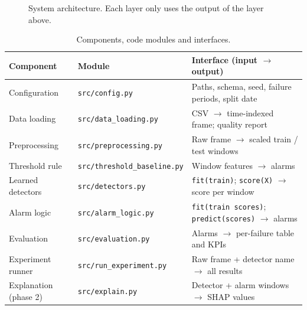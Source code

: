 \begin{figure}[H]
\centering
{}
\caption{System architecture. Each layer only uses the output of the layer above.}
\label{fig:architecture}
\end{figure}

\begin{table}[H]
\centering
\small
\caption{Components, code modules and interfaces.}
\label{tab:modules}
\begin{tabular}{p{2.6cm}p{5.0cm}p{7.3cm}}
\toprule
Component & Module & Interface (input $\rightarrow$ output) \\
\midrule
Configuration & \texttt{src/config.py} & Paths, schema, seed, failure periods, split date \\
Data loading & \texttt{src/data\_loading.py} & CSV $\rightarrow$ time-indexed frame; quality report \\
Preprocessing & \texttt{src/preprocessing.py} & Raw frame $\rightarrow$ scaled train / test windows \\
Threshold rule & \texttt{src/threshold\_baseline.py} & Window features $\rightarrow$ alarms \\
Learned detectors & \texttt{src/detectors.py} & \texttt{fit(train)}; \texttt{score(X)} $\rightarrow$ score per window \\
Alarm logic & \texttt{src/alarm\_logic.py} & \texttt{fit(train scores)}; \texttt{predict(scores)} $\rightarrow$ alarms \\
Evaluation & \texttt{src/evaluation.py} & Alarms $\rightarrow$ per-failure table and KPIs \\
Experiment runner & \texttt{src/run\_experiment.py} & Raw frame + detector name $\rightarrow$ all results \\
Explanation (phase 2) & \texttt{src/explain.py} & Detector + alarm windows $\rightarrow$ SHAP values \\
\bottomrule
\end{tabular}
\end{table}

